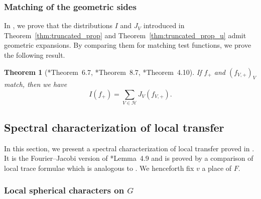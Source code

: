 \documentclass[letterpaper,11pt]{amsart}
\newcommand{\cH}{\mathcal{H}}
\newcommand{\<}{\negthickspace}
\theoremstyle{definition}
\theoremstyle{plain}
\newtheorem{theorem}[definition]{Theorem}
\theoremstyle{remark}
\numberwithin{equation}{section}
\begin{document}
\subsubsection{Matching of the geometric sides}

In \cite{BLX1}, we prove that the distributions $I$ and $J_V$ introduced in Theorem~\ref{thm:truncated_prop} and Theorem~\ref{thm:truncated_prop_u} admit geometric expansions. By comparing them for matching test functions, we prove the following result.

\begin{theorem}[\cite{BLX1}*{Theorem~6.7}, \cite{BLX1}*{Theorem~8.7}, \cite{BLX2}*{Theorem~4.10}]
    \label{thm:geom_comparison}
    If $f_+$ and $(f_{V,+})_V$ match, then we have
    \begin{equation*}
        I(f_+)=\sum_{V \in \cH}J_V(f_{V,+}).
    \end{equation*}
\end{theorem}

\subsection{Spectral characterization of local transfer}
\label{sec:spectral_local_transfer}

In this section, we present a spectral characterization of local transfer proved in \cite{BLX2}. It is the Fourier--Jacobi version of \cite{BPLZZ}*{Lemma~4.9} and is proved by a comparison of local trace formulae which is analogous to \cite{BP1}. We henceforth fix $v$ a place of $F$.

\subsubsection{Local spherical characters on $G$}
\label{subsec:local_spheri}
\end{document}
